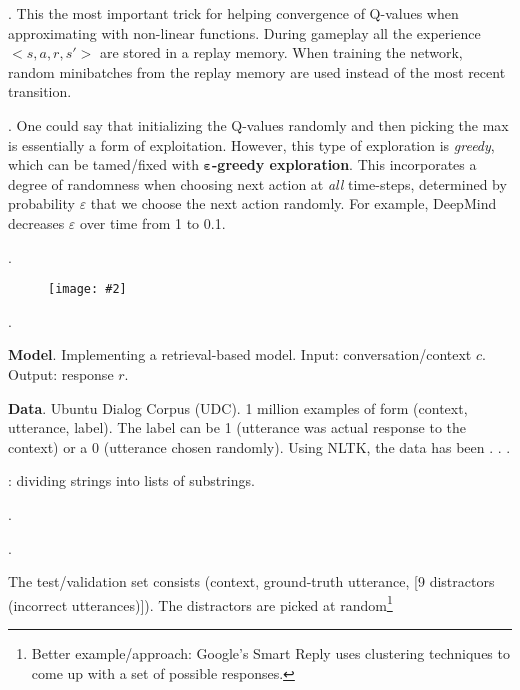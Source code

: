 \documentclass[11pt]{article}
\newcommand\myfig[2][0.3\textwidth]{\begin{figure}[h!]\centering\texttt{[image: \#2]}\end{figure}}
\newcommand\myspace[1][]{\vspace{#1\bigskipamount}}
\newcommand\p{\Needspace{10\baselineskip} \noindent}
\begin{document}
\myspace
\p {}. This the most important trick for helping convergence of Q-values when approximating with non-linear functions. During gameplay all the experience $<s, a, r, s'>$ are stored in a replay memory. When training the network, random minibatches from the replay memory are used instead of the most recent transition. 

\myspace
\p {}. One could say that initializing the Q-values randomly and then picking the max is essentially a form of exploitation. However, this type of exploration is \textit{greedy}, which can be tamed/fixed with \textbf{$\bm{\varepsilon}$-greedy exploration}. This incorporates a degree of randomness when choosing next action at \textit{all} time-steps, determined by probability $\varepsilon$ that we choose the next action randomly. For example, DeepMind decreases $\varepsilon$ over time from 1 to 0.1. 

\myspace
\p {}. 

\myfig[0.75\textwidth]{DRL_alg.PNG}




\p {}. 
\begin{compactitem}
	\item \textbf{Model}. Implementing a retrieval-based model. Input: conversation/context $c$. Output: response $r$. 
	
	\item \textbf{Data}. Ubuntu Dialog Corpus (UDC). 1 million examples of form (context, utterance, label). The label can be 1 (utterance was actual response to the context) or a 0 (utterance chosen randomly). Using NLTK, the data has been . . . 
	\begin{compactitem}[$\rightarrow$]
		\item {}: dividing strings into lists of substrings.
		\item {}. 
		\item {}. 
	\end{compactitem}
	The test/validation set consists (context, ground-truth utterance, [9 distractors (incorrect utterances)]). The distractors are picked at random\footnote{Better example/approach: Google's Smart Reply uses clustering techniques to come up with a set of possible responses.}
\end{compactitem}
\end{document}
